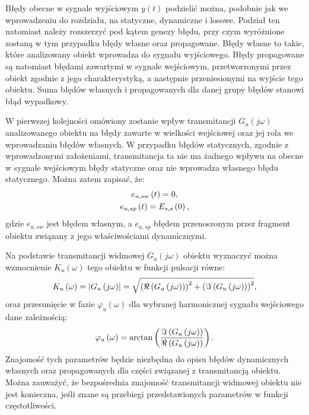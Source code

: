 Błędy obecne w sygnale wyjściowym $y(t)$ podzielić można, podobnie jak we wprowadzeniu do rozdziału, na statyczne, dynamiczne i losowe. Podział ten natomiast należy rozszerzyć pod kątem genezy błędu, przy czym wyróżnione zostaną w tym przypadku błędy własne oraz propagowane. Błędy własne to takie, które analizowany obiekt wprowadza do sygnału wyjściowego. Błędy propagowane są natomiast błędami zawartymi w sygnale wejściowym, przetworzonymi przez obiekt zgodnie z jego charakterystyką, a następnie przeniesionymi na wyjście tego obiektu. Suma błędów własnych i propagowanych dla danej grupy błędów stanowi błąd wypadkowy.

W pierwszej kolejności omówiony zostanie wpływ transmitancji $G_{u}(j\omega)$ analizowanego obiektu na błędy zawarte w wielkości wejściowej oraz jej rola we wprowadzaniu błędów własnych. W przypadku błędów statycznych, zgodnie z wprowadzonymi założeniami, transmitancja ta nie ma żadnego wpływu na obecne w sygnale wejściowym błędy statyczne oraz nie wprowadza własnego błędu statycznego. Można zatem zapisać, że:
\begin{gather}
e_{u,sw} \left(t\right) = 0 \label{eq:mid_cont_err_stat_self}, \\
e_{u,sp} \left(t\right) = E_{s,s} \left(0\right) \label{eq:mid_cont_err_stat_prop},
\end{gather}
gdzie $e_{u,sw}$ jest błędem własnym, a $e_{u,sp}$ błędem przenoszonym przez fragment obiektu związany z jego właściwościami dynamicznymi.

Na podstawie transmitancji widmowej $G_{u}(j\omega)$ obiektu wyznaczyć można wzmocnienie $K_{u}(\omega)$ tego obiektu w funkcji pulsacji równe:
\begin{equation}
K_{u} \left(\omega\right) = \left| G_{u} \left(j\omega\right) \right| =
	\sqrt{\left( \Re \left( G_{u} \left(j\omega\right) \right) \right)^{2} +
	\left( \Im \left( G_{u} \left(j\omega\right) \right) \right)^{2}}
\label{eq:mid_cont_amp},
\end{equation}
oraz przesunięcie w fazie $\varphi_{u}(\omega)$ dla wybranej harmonicznej sygnału wejściowego dane zależnością:
\begin{equation}
\varphi_{u} \left(\omega\right) = \arctan \left( \frac{\Im \left( G_{u} \left(j\omega\right) \right)}{\Re \left( G_{u} \left(j\omega\right) \right)} \right) \label{eq:mid_cont_phi}.
\end{equation}
Znajomość tych parametrów będzie niezbędna do opisu błędów dynamicznych własnych oraz propagowanych dla części związanej z transmitancją obiektu. Można zauważyć, że bezpośrednia znajomość transmitancji widmowej obiektu nie jest konieczna, jeśli znane są przebiegi przedstawionych parametrów w funkcji częstotliwości.

